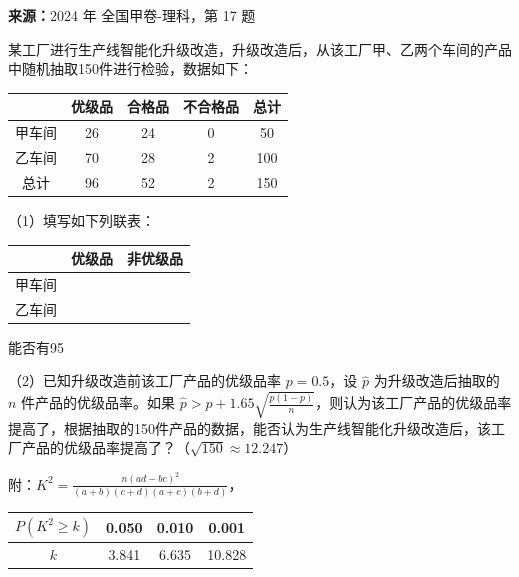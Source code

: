 \begin{question}[points=12]
\textbf{来源：}2024 年 全国甲卷-理科，第 17 题\par
某工厂进行生产线智能化升级改造，升级改造后，从该工厂甲、乙两个车间的产品中随机抽取150件进行检验，数据如下：

\begin{tabular}{c|ccc|c}

& 优级品 & 合格品 & 不合格品 & 总计 \\

\hline

甲车间 & 26 & 24 & 0 & 50 \\

乙车间 & 70 & 28 & 2 & 100 \\

\hline

总计 & 96 & 52 & 2 & 150 \\

\end{tabular}

（1）填写如下列联表：

\begin{tabular}{c|c|c}

& 优级品 & 非优级品 \\

\hline

甲车间 & & \\

乙车间 & & \\

\end{tabular}

能否有95%

（2）已知升级改造前该工厂产品的优级品率 $p=0.5$，设 $\hat{p}$ 为升级改造后抽取的 $n$ 件产品的优级品率。如果 $\hat{p}>p+1.65\sqrt{\frac{p(1-p)}{n}}$，则认为该工厂产品的优级品率提高了，根据抽取的150件产品的数据，能否认为生产线智能化升级改造后，该工厂产品的优级品率提高了？（$\sqrt{150}\approx12.247$）

附：$K^2=\frac{n(ad-bc)^2}{(a+b)(c+d)(a+c)(b+d)}$，

\begin{tabular}{c|ccc}

$P(K^2\ge k)$ & 0.050 & 0.010 & 0.001 \\

\hline

$k$ & 3.841 & 6.635 & 10.828 \\


\end{tabular}
\end{question}
